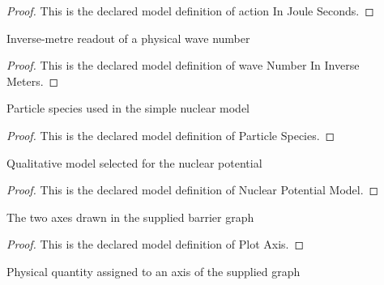 \begin{proof}
  This is the declared model definition of action In Joule Seconds.
\end{proof}
\begin{definition}
  \label{def:physics:phyx-mini-0615:phyxminiproblems-problemphyxmini0615-wavenumberininversemeters}
  Inverse-metre readout of a physical wave number
\end{definition}
\begin{proof}
  This is the declared model definition of wave Number In Inverse Meters.
\end{proof}
\begin{definition}
  \label{def:physics:phyx-mini-0615:phyxminiproblems-problemphyxmini0615-particlespecies}
  Particle species used in the simple nuclear model
\end{definition}
\begin{proof}
  This is the declared model definition of Particle Species.
\end{proof}
\begin{definition}
  \label{def:physics:phyx-mini-0615:phyxminiproblems-problemphyxmini0615-nuclearpotentialmodel}
  Qualitative model selected for the nuclear potential
\end{definition}
\begin{proof}
  This is the declared model definition of Nuclear Potential Model.
\end{proof}
\begin{definition}
  \label{def:physics:phyx-mini-0615:phyxminiproblems-problemphyxmini0615-plotaxis}
  The two axes drawn in the supplied barrier graph
\end{definition}
\begin{proof}
  This is the declared model definition of Plot Axis.
\end{proof}
\begin{definition}
  \label{def:physics:phyx-mini-0615:phyxminiproblems-problemphyxmini0615-plotaxisquantity}
  Physical quantity assigned to an axis of the supplied graph
\end{definition}
